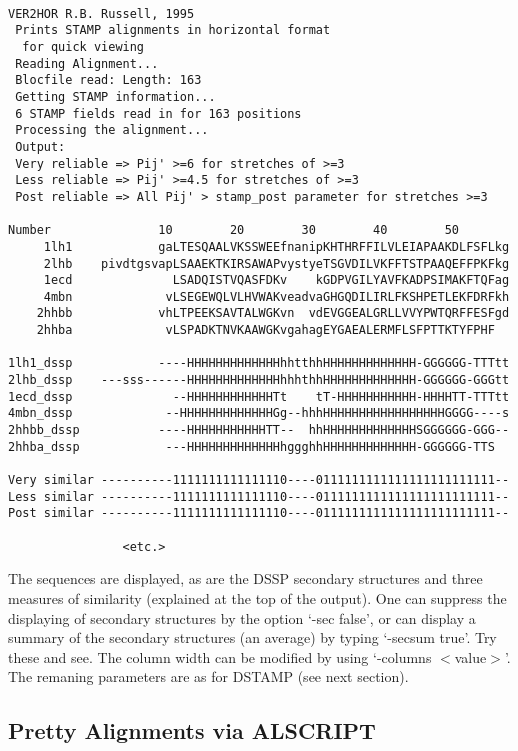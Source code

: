 \begin{scriptsize}\begin{verbatim}

VER2HOR R.B. Russell, 1995
 Prints STAMP alignments in horizontal format
  for quick viewing
 Reading Alignment...
 Blocfile read: Length: 163
 Getting STAMP information...
 6 STAMP fields read in for 163 positions 
 Processing the alignment...
 Output:
 Very reliable => Pij' >=6 for stretches of >=3
 Less reliable => Pij' >=4.5 for stretches of >=3
 Post reliable => All Pij' > stamp_post parameter for stretches >=3

Number               10        20        30        40        50    
     1lh1            gaLTESQAALVKSSWEEfnanipKHTHRFFILVLEIAPAAKDLFSFLkg
     2lhb    pivdtgsvapLSAAEKTKIRSAWAPvystyeTSGVDILVKFFTSTPAAQEFFPKFkg
     1ecd              LSADQISTVQASFDKv    kGDPVGILYAVFKADPSIMAKFTQFag
     4mbn             vLSEGEWQLVLHVWAKveadvaGHGQDILIRLFKSHPETLEKFDRFkh
    2hhbb            vhLTPEEKSAVTALWGKvn  vdEVGGEALGRLLVVYPWTQRFFESFgd
    2hhba             vLSPADKTNVKAAWGKvgahagEYGAEALERMFLSFPTTKTYFPHF  

1lh1_dssp            ----HHHHHHHHHHHHHhhtthhHHHHHHHHHHHHH-GGGGGG-TTTtt
2lhb_dssp    ---sss------HHHHHHHHHHHHHhhhthhHHHHHHHHHHHHH-GGGGGG-GGGtt
1ecd_dssp              --HHHHHHHHHHHHTt    tT-HHHHHHHHHHH-HHHHTT-TTTtt
4mbn_dssp             --HHHHHHHHHHHHHGg--hhhHHHHHHHHHHHHHHHHHGGGG----s
2hhbb_dssp           ----HHHHHHHHHHHTT--  hhHHHHHHHHHHHHHSGGGGGG-GGG--
2hhba_dssp            ---HHHHHHHHHHHHHhggghhHHHHHHHHHHHHH-GGGGGG-TTS  

Very similar ----------1111111111111110----0111111111111111111111111--
Less similar ----------1111111111111110----0111111111111111111111111--
Post similar ----------1111111111111110----0111111111111111111111111--

				<etc.>

\end{verbatim} \end{scriptsize}

The sequences are displayed, as are the DSSP secondary structures and three
measures of similarity (explained at the top of the output).  One can suppress
the displaying of secondary structures by the option `-sec false', or can display 
a summary of the secondary structures (an average) by typing `-secsum true'.  Try 
these and see.  The column width can be modified by using `-columns $<$value$>$'.  The
remaning parameters are as for DSTAMP (see next section).


\subsection{Pretty Alignments via ALSCRIPT}

